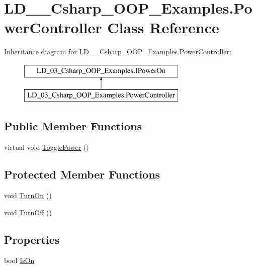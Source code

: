 \hypertarget{class_l_d__03___csharp___o_o_p___examples_1_1_power_controller}{}\section{L\+D\+\_\+\_\+\+Csharp\+\_\+\+O\+O\+P\+\_\+\+Examples.\+Power\+Controller Class Reference}
\label{class_l_d__03___csharp___o_o_p___examples_1_1_power_controller}
Inheritance diagram for L\+D\+\_\+\_\+\+Csharp\+\_\+\+O\+O\+P\+\_\+\+Examples.\+Power\+Controller\+:\begin{figure}[H]
\begin{center}
\leavevmode
\includegraphics[height=2.000000cm]{class_l_d__03___csharp___o_o_p___examples_1_1_power_controller}
\end{center}
\end{figure}
\subsection*{Public Member Functions}
\begin{DoxyCompactItemize}
\item 
virtual void \mbox{\hyperlink{class_l_d__03___csharp___o_o_p___examples_1_1_power_controller_accb660a5257db2d4d1df4e35d4147027}{Toggle\+Power}} ()
\end{DoxyCompactItemize}
\subsection*{Protected Member Functions}
\begin{DoxyCompactItemize}
\item 
void \mbox{\hyperlink{class_l_d__03___csharp___o_o_p___examples_1_1_power_controller_aac6ffd8e2256a46a26b344cd2846ed90}{Turn\+On}} ()
\item 
void \mbox{\hyperlink{class_l_d__03___csharp___o_o_p___examples_1_1_power_controller_a60438bf1fbf976ad624eb18f8d8d7edb}{Turn\+Off}} ()
\end{DoxyCompactItemize}
\subsection*{Properties}
\begin{DoxyCompactItemize}
\item 
bool \mbox{\hyperlink{class_l_d__03___csharp___o_o_p___examples_1_1_power_controller_a1e3e0b435604ac040029c0c3df851a97}{Is\+On}}
\end{DoxyCompactItemize}


